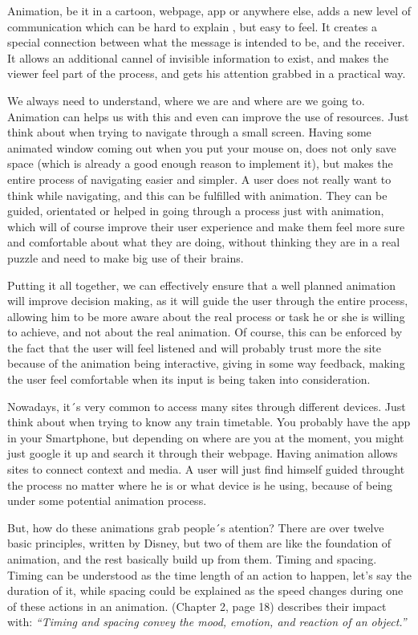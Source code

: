 Animation, be it in a cartoon, webpage, app or anywhere else, adds a new level 
of communication which can be hard to explain , but easy to feel. It creates a 
special connection between what the message is intended to be, and the 
receiver. It allows an additional cannel of invisible information to exist, and 
makes the viewer feel part of the process, and gets his attention grabbed in a 
practical way.

We always need to understand, where we are and where are we going to. Animation 
can helps us with this and even can improve the use of resources. Just think 
about when trying to navigate through a small screen. Having some animated 
window coming out when you put your mouse on, does not only save space (which 
is already a good enough reason to implement it), but makes the entire process 
of navigating easier and simpler. A user does not really want to think while 
navigating, and this can be fulfilled with animation. They can be guided, 
orientated or helped in going through a process just with animation, which will 
of course improve their user experience and make them feel more sure and 
comfortable about what they are doing, without thinking they are in a real 
puzzle and need to make big use of their brains.

Putting it all together, we can effectively ensure that a well planned 
animation will improve decision making, as it will guide the user through the 
entire process, allowing him to be more aware about the real process or task he 
or she is willing to achieve, and not about the real animation. Of course, this 
can be enforced by the fact that the user will feel listened and will probably 
trust more the site because of the animation being interactive, giving in some 
way feedback, making the user feel comfortable when its input is being taken 
into consideration.

Nowadays, it´s very common to access many sites through different devices. 
Just think about when trying to know any train timetable. You probably have the 
app in your Smartphone, but depending on where are you at the moment, you might 
just google it up and search it through their webpage. Having animation allows 
sites to connect context and media. A user will just find himself guided 
throught the process no matter where he is or what device is he using, because 
of being under some potential animation process. 

But, how do these animations grab people´s atention? There are over twelve 
basic principles, written by Disney, but two of them are like the foundation of 
animation, and the rest basically build up from them. Timing and spacing. 
Timing can be understood as the time length of an action to happen, let’s say 
the duration of it, while spacing could be explained as the speed changes 
during one of these actions in an animation. 
\citet{head2016designing} (Chapter 2, page 18) describes their impact with: 
{\em“Timing and spacing convey the mood, emotion, and reaction of an 
object.”}

